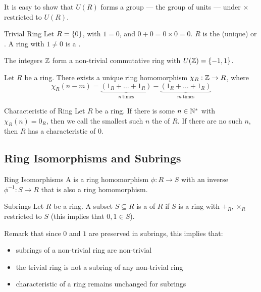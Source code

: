\documentclass{styles/tufte}
\begin{document}
It is easy to show that $U(R)$ forms a group --- the group of units --- under $\times$ restricted to $U(R)$.

\begin{definition}{Trivial Ring}{}
  Let $R = \set{0}$, with $1 = 0$, and $0 + 0 = 0 \times 0 = 0$. $R$ is the (unique)  or . A ring with $1 \neq 0$ is a .
\end{definition}

\begin{example}{}{}
  The integers $\mathbb{Z}$ form a non-trivial commutative ring with $U(\mathbb{Z}) = \set{-1, 1}$.
\end{example}

\begin{theorem}{}{}
  Let $R$ be a ring. There exists a unique ring homomorphism $\chi_R: \mathbb{Z} \to R$, where
  \[ \chi_R(n - m) = \underbrace{(1_R + \dots + 1_R)}_{n\ \mathrm{times}} - \underbrace{(1_R + \dots + 1_R)}_{m\ \mathrm{times}} \]
\end{theorem}

\begin{definition}{Characteristic of Ring}{}
  Let $R$ be a ring. If there is some $n \in \mathbb{N}^*$ with $\chi_R(n) = 0_R$, then we call the smallest such $n$ the  of $R$. If there are no such $n$, then $R$ has a characteristic of $0$.
\end{definition}


\subsection{Ring Isomorphisms and Subrings}

\begin{definition}{Ring Isomorphisms}{}
  A  is a ring homomorphism $\phi: R \to S$ with an inverse $\phi^{-1}: S \to R$ that is also a ring homomorphism.
\end{definition}

\begin{definition}{Subrings}{}
  Let $R$ be a ring. A subset $S \subseteq R$ is a  of $R$ if $S$ is a ring with $+_R, \times_R$ restricted to $S$ (this implies that $0, 1 \in S$).
\end{definition}

Remark that since $0$ and $1$ are preserved in subrings, this implies that:
\begin{itemize}
  \item subrings of a non-trivial ring are non-trivial
  \item the trivial ring is not a subring of any non-trivial ring
  \item characteristic of a ring remains unchanged for subrings
\end{itemize}
\end{document}
